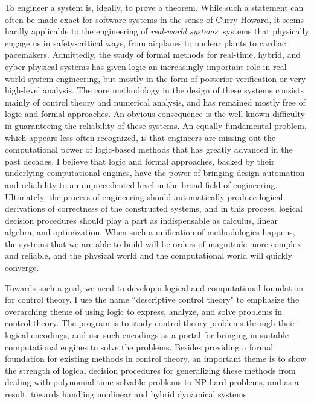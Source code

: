 \documentclass[11pt]{article}
\theoremstyle{definition}
\begin{document}
To engineer a system is, ideally, to prove a theorem. While such a statement can often be made exact for software systems in the sense of Curry-Howard, it seems hardly applicable to the engineering of {\em real-world systems}: systems that physically engage us in safety-critical ways, from airplanes to nuclear plants to cardiac pacemakers. Admittedly, the study of formal methods for real-time, hybrid, and cyber-physical systems has given logic an increasingly important role in real-world system engineering, but mostly in the form of posterior verification or very high-level analysis. The core methodology in the design of these systems consists mainly of control theory and numerical analysis, and has remained mostly free of logic and formal approaches. An obvious consequence is the well-known difficulty in guaranteeing the reliability of these systems. An equally fundamental problem, which appears less often recognized, is that engineers are missing out the computational power of logic-based methods that has greatly advanced in the past decades. I believe that logic and formal approaches, backed by their underlying computational engines, have the power of bringing design automation and reliability to an unprecedented level in the broad field of engineering. Ultimately, the process of engineering should automatically produce logical derivations of correctness of the constructed systems, and in this process, logical decision procedures should play a part as indispensable as calculus, linear algebra, and optimization. When such a unification of methodologies happens, the systems that we are able to build will be orders of magnitude more complex and reliable, and the physical world and the computational world will quickly converge. 

Towards such a goal, we need to develop a logical and computational foundation for control theory. I use the name ``descriptive control theory" to emphasize the overarching theme of using logic to express, analyze, and solve problems in control theory. The program is to study control theory problems through their logical encodings, and use such encodings as a portal for bringing in suitable computational engines to solve the problems. Besides providing a formal foundation for existing methods in control theory, an important theme is to show the strength of logical decision procedures for generalizing these methods from dealing with polynomial-time solvable problems to NP-hard problems, and as a result, towards handling nonlinear and hybrid dynamical systems. 
 
\end{document}
